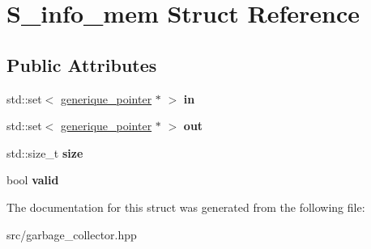 \hypertarget{struct_s__info__mem}{\section{S\-\_\-info\-\_\-mem Struct Reference}
\label{struct_s__info__mem}
}
\subsection*{Public Attributes}
\begin{DoxyCompactItemize}
\item 
\hypertarget{struct_s__info__mem_ade17a89d93e762516b2a2ed4ae292a9d}{std\-::set$<$ \hyperlink{classgenerique__pointer}{generique\-\_\-pointer} $\ast$ $>$ {\bfseries in}}\label{struct_s__info__mem_ade17a89d93e762516b2a2ed4ae292a9d}

\item 
\hypertarget{struct_s__info__mem_ab323a942560d3e543bbce86da40fd083}{std\-::set$<$ \hyperlink{classgenerique__pointer}{generique\-\_\-pointer} $\ast$ $>$ {\bfseries out}}\label{struct_s__info__mem_ab323a942560d3e543bbce86da40fd083}

\item 
\hypertarget{struct_s__info__mem_a868968165ef01c123473007b3c654ceb}{std\-::size\-\_\-t {\bfseries size}}\label{struct_s__info__mem_a868968165ef01c123473007b3c654ceb}

\item 
\hypertarget{struct_s__info__mem_a2eb61729e6efa09a23957a7dcca0f667}{bool {\bfseries valid}}\label{struct_s__info__mem_a2eb61729e6efa09a23957a7dcca0f667}

\end{DoxyCompactItemize}


The documentation for this struct was generated from the following file\-:\begin{DoxyCompactItemize}
\item 
src/garbage\-\_\-collector.\-hpp\end{DoxyCompactItemize}

